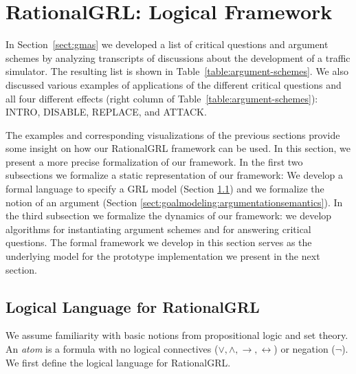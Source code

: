 \section{RationalGRL: Logical Framework}
\label{sect:formalframework}

In Section~\ref{sect:gmas} we developed a list of critical questions and argument schemes by analyzing transcripts of discussions about the development of a traffic simulator. The resulting list is shown in Table~\ref{table:argument-schemes}. We also discussed various examples of applications of the different critical questions and all four different effects (right column of Table~\ref{table:argument-schemes}): \textsf{INTRO}, \textsf{DISABLE}, \textsf{REPLACE}, and \textsf{ATTACK}.

The examples and corresponding visualizations of the previous sections provide some insight on how our RationalGRL framework can be used. In this section, we present a more precise formalization of our framework. In the first two subsections we formalize a static representation of our framework: We develop a formal language to specify a GRL model (Section \ref{sect:goalmodeling:logicallanguage}) and we formalize the notion of an argument (Section \ref{sect:goalmodeling:argumentationsemantics}). In the third subsection we formalize the dynamics of our framework: we develop algorithms for instantiating argument schemes and for answering critical questions. The formal framework we develop in this section serves as the underlying model for the prototype implementation we present in the next section.

\subsection{Logical Language for RationalGRL}
\label{sect:goalmodeling:logicallanguage}

We assume familiarity with basic notions from propositional logic and set theory. An \emph{atom} is a formula with no logical connectives ($\vee, \wedge, \rightarrow, \leftrightarrow$) or negation ($\neg$). We first define the logical language for RationalGRL. 

